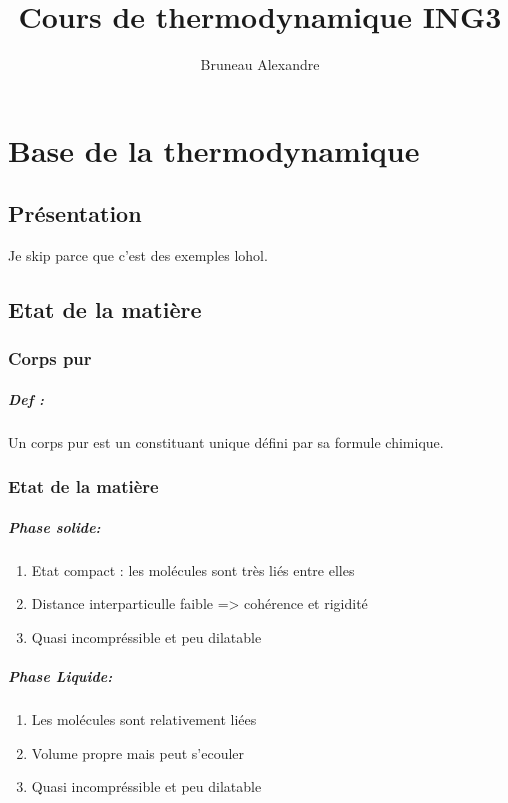 \documentclass[a4paper,10pt]{report}
\title{Cours de thermodynamique ING3}
\author{Bruneau Alexandre}
\begin{document}
\maketitle

\begin{abstract}

\end{abstract}
\chapter{Base de la thermodynamique}
\section{Présentation}
Je skip parce que c'est des exemples lohol.

\section{Etat de la matière}
\subsection{Corps pur}
\paragraph{Def : }
Un corps pur est un constituant unique défini par sa formule chimique.

\subsection{Etat de la matière}
\paragraph{Phase solide:}
\begin{enumerate}
 \item Etat compact : les molécules sont très liés entre elles
 \item Distance interparticulle faible => cohérence et rigidité
 \item Quasi incompréssible et peu dilatable
\end{enumerate}
\paragraph{Phase Liquide:}
\begin{enumerate}
 \item Les molécules sont relativement liées
 \item Volume propre mais peut s'ecouler
 \item Quasi incompréssible et peu dilatable
\end{enumerate}
\end{document}
